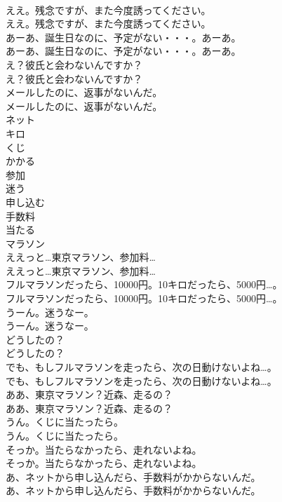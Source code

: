 \documentclass[8pt]{extreport}
\begin{document}
\begin{CJK}{UTF8}{min}
\\	ええ。残念ですが、また今度誘ってください。	
\\	ええ。残念ですが、また今度誘ってください。 
\\	あーあ、誕生日なのに、予定がない・・・。あーあ。	
\\	あーあ、誕生日なのに、予定がない・・・。あーあ。 
\\	え？彼氏と会わないんですか？	
\\	え？彼氏と会わないんですか？ 
\\	メールしたのに、返事がないんだ。	
\\	メールしたのに、返事がないんだ。 
\\	ネット
\\	キロ
\\	くじ
\\	かかる
\\	参加
\\	迷う
\\	申し込む
\\	手数料
\\	当たる
\\	マラソン
\\	ええっと…東京マラソン、参加料…	
\\	ええっと…東京マラソン、参加料… 
\\	フルマラソンだったら、10000円。10キロだったら、5000円…。	
\\	フルマラソンだったら、10000円。10キロだったら、5000円…。 
\\	うーん。迷うなー。	
\\	うーん。迷うなー。 
\\	どうしたの？	
\\	どうしたの？ 
\\	でも、もしフルマラソンを走ったら、次の日動けないよね…。	
\\	でも、もしフルマラソンを走ったら、次の日動けないよね…。 
\\	ああ、東京マラソン？近森、走るの？	
\\	ああ、東京マラソン？近森、走るの？ 
\\	うん。くじに当たったら。	
\\	うん。くじに当たったら。 
\\	そっか。当たらなかったら、走れないよね。	
\\	そっか。当たらなかったら、走れないよね。 
\\	あ、ネットから申し込んだら、手数料がかからないんだ。	
\\	あ、ネットから申し込んだら、手数料がかからないんだ。 

\end{CJK}
\end{document}
